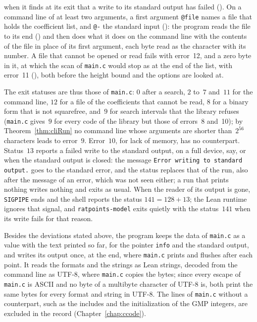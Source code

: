 \begin{definition}
  when it finds at its exit that a write to its standard output has failed
  (). On a command line of at least two arguments, a first argument
  \verb|@file| names a file that holds the coefficient list, and \verb|@-| the standard input
  (): the program reads the file to its end ()
  and then does what it does on the command line with the contents of the file in place of its first
  argument, each byte read as the character with its number. A file that cannot be opened or read
  fails with error~12, and a zero byte in it, at which the scan of \verb|main.c| would stop as at
  the end of the list, with error~11 (), both before the height bound and
  the options are looked at.
\end{definition}

The exit statuses are thus those of \verb|main.c|: $0$ after a search, $2$ to~$7$ and~$11$ for the
command line, $12$ for a file of the coefficients that cannot be read, $8$ for a binary form that is
not squarefree, and~$9$ for search intervals that the library refuses (\verb|main.c| gives~$9$ for
every code of the library but those of errors~8 and~10); by Theorem~\ref{thm:cliRun} no command line
whose arguments are shorter than~$2^{56}$ characters leads to error~$9$. Error~$10$, for lack of
memory, has no counterpart. Status~$13$ reports a failed write to the standard output, on a full
device, say, or when the standard output is closed: the message
\verb|Error writing to standard output.| goes to the standard error, and the status replaces that of
the run, also after the message of an error, which was not seen either; a run that prints nothing
writes nothing and exits as usual. When the reader of its output is gone, \verb|SIGPIPE| ends
\ratpoints{} and the shell reports the status $141 = 128 + 13$; the Lean runtime ignores that
signal, and \verb|ratpoints-model| exits quietly with the status~$141$ when its write fails for that
reason.

\begin{remark}[Deviations]\label{rem:outputDeviations}
  Besides the deviations stated above, the program keeps the data of \verb|main.c| as a value with
  the text printed so far, for the pointer \verb|info| and the standard output, and writes its
  output once, at the end, where \verb|main.c| prints and flushes after each point. It reads the
  formats and the strings as Lean strings, decoded from the command line as UTF-8, where
  \verb|main.c| copies the bytes; since every escape of \verb|main.c| is ASCII and no byte of a
  multibyte character of UTF-8 is, both print the same bytes for every format and string in UTF-8.
  The lines of \verb|main.c| without a counterpart, such as the includes and the initialization of
  the GMP integers, are excluded in the record (Chapter~\ref{chap:ccode}).
\end{remark}
